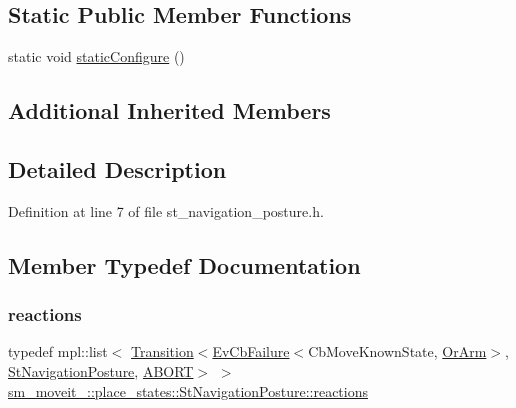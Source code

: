 \subsection*{Static Public Member Functions}
\begin{DoxyCompactItemize}
\item 
static void \hyperlink{structsm__moveit__4_1_1place__states_1_1StNavigationPosture_a29ac0c6cd858bb59ca3bc103da13b0a0}{static\+Configure} ()
\end{DoxyCompactItemize}
\subsection*{Additional Inherited Members}


\subsection{Detailed Description}


Definition at line 7 of file st\+\_\+navigation\+\_\+posture.\+h.



\subsection{Member Typedef Documentation}
\mbox{\label{structsm__moveit__4_1_1place__states_1_1StNavigationPosture_aef5fd3b6c31c7e0c2dfd14753496eb7c}} 
\subsubsection{\texorpdfstring{reactions}{reactions}}
{\footnotesize\ttfamily typedef mpl\+::list$<$ \hyperlink{classsmacc_1_1Transition}{Transition}$<$\hyperlink{structsmacc_1_1EvCbFailure}{Ev\+Cb\+Failure}$<$Cb\+Move\+Known\+State, \hyperlink{classsm__moveit__4_1_1OrArm}{Or\+Arm}$>$, \hyperlink{structsm__moveit__4_1_1place__states_1_1StNavigationPosture}{St\+Navigation\+Posture}, \hyperlink{structsmacc_1_1default__transition__tags_1_1ABORT}{A\+B\+O\+RT}$>$ $>$ \hyperlink{structsm__moveit__4_1_1place__states_1_1StNavigationPosture_aef5fd3b6c31c7e0c2dfd14753496eb7c}{sm\+\_\+moveit\+\_\+::place\+\_\+states\+::\+St\+Navigation\+Posture\+::reactions}}




